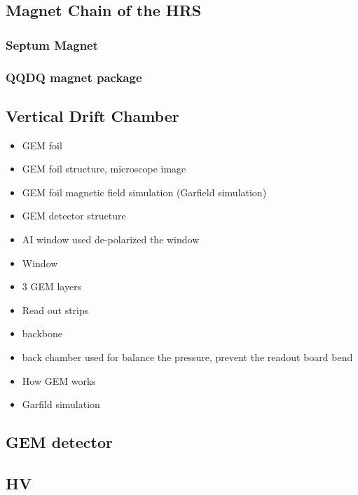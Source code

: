 \subsection{Magnet Chain of the HRS}
\subsubsection{Septum Magnet}
\subsubsection{QQDQ magnet package}
\subsection{Vertical Drift Chamber}

\begin{itemize}
    \item GEM foil
    \item GEM foil structure, microscope image
    \item GEM foil magnetic field simulation (Garfield simulation)
\end{itemize}


\begin{itemize}
    \item GEM detector structure
    \item AI window used de-polarized the window
    \item Window 
    \item 3 GEM layers
    \item Read out strips 
    \item backbone 
    \item back chamber used for balance the pressure, prevent the readout board bend
\end{itemize}


\begin{itemize}
    \item How GEM works
    \item Garfild simulation 
\end{itemize}

\subsection{GEM detector}
\subsection{HV}

